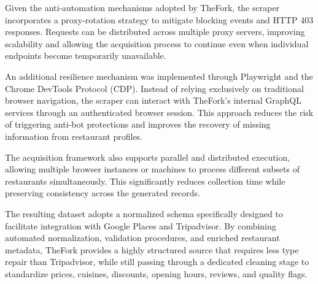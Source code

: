 Given the anti-automation mechanisms adopted by TheFork, the scraper incorporates a proxy-rotation strategy to mitigate blocking events and HTTP 403 responses. Requests can be distributed across multiple proxy servers, improving scalability and allowing the acquisition process to continue even when individual endpoints become temporarily unavailable.

An additional resilience mechanism was implemented through Playwright and the Chrome DevTools Protocol (CDP). Instead of relying exclusively on traditional browser navigation, the scraper can interact with TheFork's internal GraphQL services through an authenticated browser session. This approach reduces the risk of triggering anti-bot protections and improves the recovery of missing information from restaurant profiles.

The acquisition framework also supports parallel and distributed execution, allowing multiple browser instances or machines to process different subsets of restaurants simultaneously. This significantly reduces collection time while preserving consistency across the generated records.

The resulting dataset adopts a normalized schema specifically designed to facilitate integration with Google Places and Tripadvisor. By combining automated normalization, validation procedures, and enriched restaurant metadata, TheFork provides a highly structured source that requires less type repair than Tripadvisor, while still passing through a dedicated cleaning stage to standardize prices, cuisines, discounts, opening hours, reviews, and quality flags.
